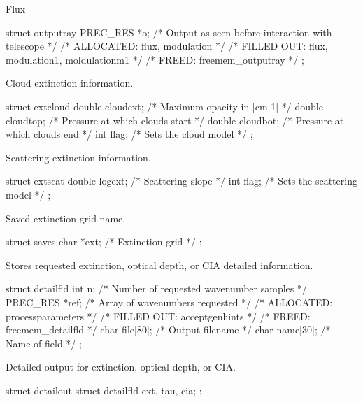 \documentclass[letterpaper,12pt]{article}
\begin{document}
\noindent
Flux
\begin{plain}
struct outputray{
  PREC_RES *o;     /* Output as seen before interaction with telescope      */
    /* ALLOCATED:	flux, modulation                    */
    /* FILLED OUT:	flux, modulation1, moldulationm1    */
    /* FREED: 		freemem_outputray                   */ 
};
\end{plain}

\noindent
Cloud extinction information.
\begin{plain}
struct extcloud{
  double cloudext;  /* Maximum opacity in [cm-1]                            */
  double cloudtop;  /* Pressure at which clouds start                       */
  double cloudbot;  /* Pressure at which clouds end                         */
  int flag;         /* Sets the cloud model                                 */
};
\end{plain}

\noindent
Scattering extinction information.
\begin{plain}
struct extscat{
  double logext; /* Scattering slope                                        */
  int flag;      /* Sets the scattering model                               */
};
\end{plain}

\noindent
Saved extinction grid name.
\begin{plain}
struct saves{
  char *ext;   /* Extinction grid                                           */
};
\end{plain}

\noindent
Stores requested extinction, optical depth, or CIA detailed information.
\begin{plain}
struct detailfld{
  int n;         /* Number of requested wavenumber samples */
  PREC_RES *ref; /* Array of wavenumbers requested         */
    /* ALLOCATED:	processparameters				    */
    /* FILLED OUT:	acceptgenhints					    */
    /* FREED: 		freemem_detailfld				    */ 
  char file[80]; /* Output filename                        */
  char name[30]; /* Name of field                          */
};
\end{plain}

\noindent
Detailed output for extinction, optical depth, or CIA.
\begin{plain}
struct detailout{
  struct detailfld ext, tau, cia;
};
\end{plain}
\end{document}

